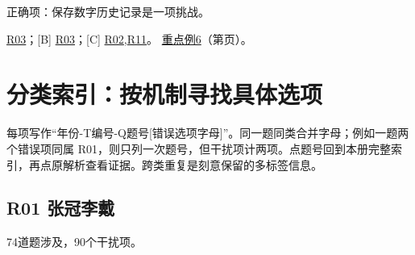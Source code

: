 \documentclass[11pt,a4paper]{article}
\begin{document}
\noindent 正确项：保存数字历史记录是一项挑战。\par\nopagebreak
\noindent [A] \hyperref[cat-R03]{R03}；[B] \hyperref[cat-R03]{R03}；[C] \hyperref[cat-R02]{R02},\hyperref[cat-R11]{R11}。
\hyperref[case-2025-T4-Q40]{重点例6}（第\pageref{case-2025-T4-Q40}页）。
\par\smallskip
\setlength{\parskip}{3pt}
\clearpage\section{分类索引：按机制寻找具体选项}\label{class-index}
每项写作“年份-T编号-Q题号[错误选项字母]”。同一题同类合并字母；例如一题两个错误项同属 R01，则只列一次题号，但干扰项计两项。点题号回到本册完整索引，再点原解析查看证据。跨类重复是刻意保留的多标签信息。

\subsection{R01 张冠李戴}\label{class-R01}
74道题涉及，90个干扰项。
\end{document}
